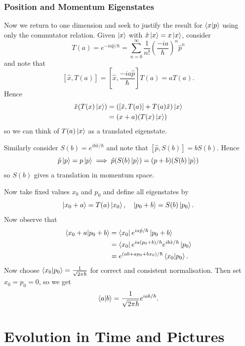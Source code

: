 \documentclass{article}
\begin{document}
\subsubsection{Position and Momentum Eigenstates}
Now we return to one dimension and seek to justify the result for $ \bra{x}\ket{p} $ using only the commutator relation. Given $ \ket x $ with $ \hat x \ket x = x\ket x $, consider
\[
	T(a) = e^{-ia\hat p/\hbar} = \sum_{n=0}^\infty \frac 1{n!} \left(\frac{-ia}{\hbar}\right)^n \hat p^n
\]
and note that
\[
[\hat x,T(a)] = \left[\hat x, \frac{-ia\hat p}{\hbar}\right]T(a) = aT(a).
\]
Hence 
\begin{align*}
	\hat x(T(x)\ket x) &= ([\hat x, T(a)]+T(a)\hat x)\ket x \\
			   &= (x+a)(T(x)\ket x)
\end{align*}
so we can think of $ T(a)\ket x $ as a translated eigenstate.\par
Similarly consider $ S(b) = e^{ib\hat x/\hbar} $ and note that $ [\hat p, S(b)] = bS(b) $. Hence
\[
  \hat p\ket p = p \ket p \implies \hat p (S(b)\ket p) = (p+b)(S(b)\ket p)
\]
so $ S(b) $ gives a translation in momentum space.
\par
Now take fixed values $ x_0 $ and $ p_0 $ and define all eigenstates by
\[
	\ket{x_0+a} = T(a) \ket{x_0},\quad \ket{p_0+b} = S(b) \ket{p_0}.
\]
Now observe that 
\begin{align*}
	\bra{x_0+a}\ket{p_0+b} &= \bra{x_0} e^{ia\hat p/\hbar}\ket{p_0+b} \\
			       &= \bra{x_0} e^{ia(p_0+b)/\hbar}e^{ib\hat x/\hbar} \ket {p_0} \\
			       &= e^{(ab +ap_0 + bx_0)/\hbar}\bra{x_0}\ket{p_0}. \\
\end{align*}
Now choose $ \bra{x_0}\ket{p_0} = \frac 1{\sqrt{2\pi\hbar}} $ for correct and consistent normalisation. Then set $ x_0 = p_0 = 0 $, so we get
\[
	\bra {a}\ket {b} = \frac 1{\sqrt{2\pi \hbar}} e^{iab/\hbar}.
\]
\section{Evolution in Time and Pictures}
\end{document}
